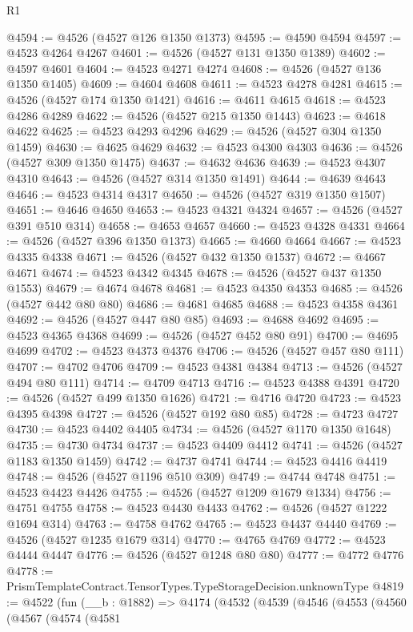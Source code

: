 \begin{lexlean}{R1}
\begin{coremodule}
@4594 := @4526 (@4527 @126 @1350 @1373)
@4595 := @4590 @4594
@4597 := @4523 @4264 @4267
@4601 := @4526 (@4527 @131 @1350 @1389)
@4602 := @4597 @4601
@4604 := @4523 @4271 @4274
@4608 := @4526 (@4527 @136 @1350 @1405)
@4609 := @4604 @4608
@4611 := @4523 @4278 @4281
@4615 := @4526 (@4527 @174 @1350 @1421)
@4616 := @4611 @4615
@4618 := @4523 @4286 @4289
@4622 := @4526 (@4527 @215 @1350 @1443)
@4623 := @4618 @4622
@4625 := @4523 @4293 @4296
@4629 := @4526 (@4527 @304 @1350 @1459)
@4630 := @4625 @4629
@4632 := @4523 @4300 @4303
@4636 := @4526 (@4527 @309 @1350 @1475)
@4637 := @4632 @4636
@4639 := @4523 @4307 @4310
@4643 := @4526 (@4527 @314 @1350 @1491)
@4644 := @4639 @4643
@4646 := @4523 @4314 @4317
@4650 := @4526 (@4527 @319 @1350 @1507)
@4651 := @4646 @4650
@4653 := @4523 @4321 @4324
@4657 := @4526 (@4527 @391 @510 @314)
@4658 := @4653 @4657
@4660 := @4523 @4328 @4331
@4664 := @4526 (@4527 @396 @1350 @1373)
@4665 := @4660 @4664
@4667 := @4523 @4335 @4338
@4671 := @4526 (@4527 @432 @1350 @1537)
@4672 := @4667 @4671
@4674 := @4523 @4342 @4345
@4678 := @4526 (@4527 @437 @1350 @1553)
@4679 := @4674 @4678
@4681 := @4523 @4350 @4353
@4685 := @4526 (@4527 @442 @80 @80)
@4686 := @4681 @4685
@4688 := @4523 @4358 @4361
@4692 := @4526 (@4527 @447 @80 @85)
@4693 := @4688 @4692
@4695 := @4523 @4365 @4368
@4699 := @4526 (@4527 @452 @80 @91)
@4700 := @4695 @4699
@4702 := @4523 @4373 @4376
@4706 := @4526 (@4527 @457 @80 @111)
@4707 := @4702 @4706
@4709 := @4523 @4381 @4384
@4713 := @4526 (@4527 @494 @80 @111)
@4714 := @4709 @4713
@4716 := @4523 @4388 @4391
@4720 := @4526 (@4527 @499 @1350 @1626)
@4721 := @4716 @4720
@4723 := @4523 @4395 @4398
@4727 := @4526 (@4527 @192 @80 @85)
@4728 := @4723 @4727
@4730 := @4523 @4402 @4405
@4734 := @4526 (@4527 @1170 @1350 @1648)
@4735 := @4730 @4734
@4737 := @4523 @4409 @4412
@4741 := @4526 (@4527 @1183 @1350 @1459)
@4742 := @4737 @4741
@4744 := @4523 @4416 @4419
@4748 := @4526 (@4527 @1196 @510 @309)
@4749 := @4744 @4748
@4751 := @4523 @4423 @4426
@4755 := @4526 (@4527 @1209 @1679 @1334)
@4756 := @4751 @4755
@4758 := @4523 @4430 @4433
@4762 := @4526 (@4527 @1222 @1694 @314)
@4763 := @4758 @4762
@4765 := @4523 @4437 @4440
@4769 := @4526 (@4527 @1235 @1679 @314)
@4770 := @4765 @4769
@4772 := @4523 @4444 @4447
@4776 := @4526 (@4527 @1248 @80 @80)
@4777 := @4772 @4776
@4778 := PrismTemplateContract.TensorTypes.TypeStorageDecision.unknownType
@4819 := @4522
    (fun (__b : @1882) =>
    @4174
      (@4532
        (@4539
          (@4546
            (@4553
              (@4560
                (@4567
                  (@4574
                    (@4581

\end{coremodule}
\end{lexlean}

